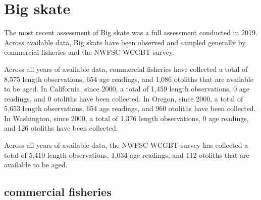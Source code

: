 \documentclass[11pt,
  english,
  letterpaper,
]{article}
\begin{document}

\hypertarget{big-skate}{%
\section{Big skate}\label{big-skate}}

\leavevmode\tagmcend\tagstructend


The most recent assessment of Big skate was a full assessment conducted in 2019. Across available data, Big skate have been observed and sampled generally by commercial fisheries and the NWFSC WCGBT survey.

\leavevmode\tagmcend\tagstructend\par


Across all years of available data, commercial fisheries have collected a total of 8,575 length observations, 654 age readings, and 1,086 otoliths that are available to be aged. In California, since 2000, a total of 1,459 length observations, 0 age readings, and 0 otoliths have been collected. In Oregon, since 2000, a total of 5,653 length observations, 654 age readings, and 960 otoliths have been collected. In Washington, since 2000, a total of 1,376 length observations, 0 age readings, and 126 otoliths have been collected.

\leavevmode\tagmcend\tagstructend\par


Across all years of available data, the NWFSC WCGBT survey has collected a total of 5,410 length observations, 1,034 age readings, and 112 otoliths that are available to be aged.

\leavevmode\tagmcend\tagstructend\par


\hypertarget{commercial-fisheries-3}{%
\subsection{commercial fisheries}\label{commercial-fisheries-3}}

\leavevmode\tagmcend\tagstructend

\end{document}
